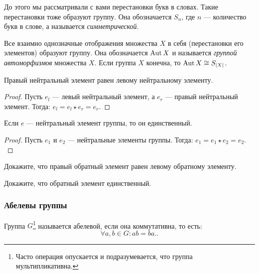 \begin{example}
    До этого мы рассматривали с вами перестановки букв в словах.
    Такие перестановки тоже образуют группу. Она обозначается $S_n$, 
    где $n$ --- количество букв в слове, а называется \emph{симметрической}.
\end{example}

\begin{example}\label{ex:AutX}
Все взаимно однозначные отображения множества $X$ в себя (перестановки его элементов) образуют группу. Она обозначается $\operatorname{Aut} X$ и называется \emph{группой автоморфизмов} множества $X$. Если группа $X$ конечна, то $\operatorname{Aut} X \cong S_{|X|}$.
\end{example}

\begin{proposition}
    Правый нейтральный элемент равен левому нейтральному элементу.
\end{proposition}
\begin{proof}
    Пусть $e_l$ --- левый нейтральный элемент, а $e_r$ --- правый нейтральный элемент. Тогда:
    \(
    e_l = e_l \star e_r = e_r.
    \)
\end{proof}
\begin{proposition}
    Если $e$ --- нейтральный элемент группы, то он единственный.
\end{proposition}
\begin{proof}
    Пусть $e_1$ и $e_2$ --- нейтральные элементы группы. Тогда:
    \(
        e_1 = e_1 \star e_2 = e_2.
    \)
\end{proof}
\begin{practice}
    Докажите, что правый обратный элемент равен левому обратному элементу.
\end{practice}
\begin{practice}
    Докажите, что обратный элемент единственный.
\end{practice}
    


\setcounter{footnote}{0}
\subsubsection{Абелевы группы}
\begin{definition}
    Группа $G$\footnote{Часто операция опускается и подразумевается, что группа мультипликативна.} 
    называется абелевой, если она коммутативна, то есть: \[
        \forall a, b \in G: ab = ba.
    .\] 
\end{definition}

